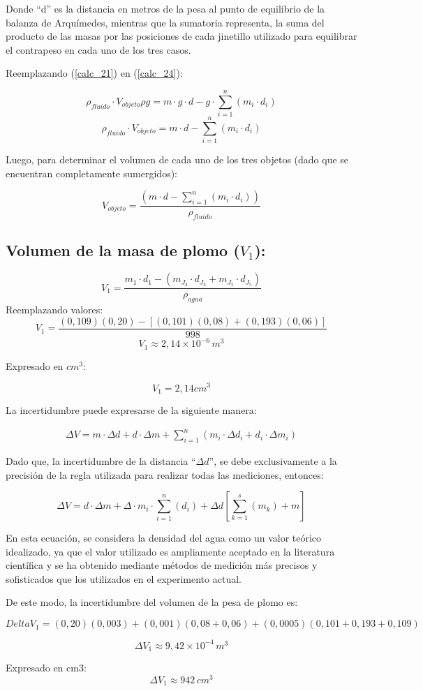\documentclass[../main.tex]{subfiles}
\begin{document}
Donde “d” es la distancia en metros de la pesa al punto de
equilibrio de la balanza de Arquímedes, mientras que la 
sumatoria representa, la suma del producto de las masas por 
las posiciones de cada jinetillo utilizado para equilibrar el 
contrapeso en cada uno de los tres casos.

Reemplazando (\ref{calc_21}) en (\ref{calc_24}):

\[\rho_{fluido}\cdot V_{objeto}\rho g=m\cdot g\cdot d-g\cdot\sum_{i=1}^n (m_i\cdot d_i ) \]
\[\rho_{fluido}\cdot V_{objeto}=m\cdot d-\sum_{i=1}^n (m_i\cdot d_i ) \]

Luego, para determinar el volumen de cada uno de los tres objetos (dado que se encuentran completamente sumergidos):

\begin{equation} \label{calc_25}
    V_{objeto}=\frac{(m\cdot d -\sum_{i=1}^n (m_i\cdot d_i ) )}{\rho_{fluido}} 
\end{equation}

\subsection{Volumen de la masa de plomo ($V_1$):}

\[V_1=\frac{m_1\cdot d_1- (m_{J_3} \cdot d_{J_3}+m_{J_5} \cdot d_{J_5} )}{\rho_{agua}} \]
Reemplazando valores:
\[V_1=\frac{(0,109)(0,20)-[(0,101)(0,08)+(0,193)(0,06)]}{998}\]
\[V_1\approx2,14\times10^{-6}\,  m^3 \]

Expresado en $cm^3$:

\[V_1=2,14cm^3\]

La incertidumbre puede expresarse de la siguiente manera:

\begin{align} \nonumber
    \Delta V=m\cdot\Delta d+d\cdot\Delta m+\sum_{i=1}^n (m_i \cdot\Delta d_i+d_i \cdot\Delta m_i ) 
\end{align}

Dado que, la incertidumbre de la distancia “$\Delta d$”, se debe exclusivamente a la precisión de la
regla utilizada para realizar todas las mediciones, entonces:

\begin{equation} \label{calc_26}
    \Delta V=d\cdot\Delta m+\Delta\cdot m_i \cdot \sum_{i=1}^n (d_i ) +\Delta d\left[\sum_{k=1}^s(m_k ) +m\right]
\end{equation}

En esta ecuación, se considera la densidad del agua como un valor teórico idealizado, ya que el valor utilizado es ampliamente aceptado en la literatura científica y se ha obtenido mediante métodos de medición más precisos y sofisticados que los utilizados en el experimento actual.

De este modo, la incertidumbre del volumen de la pesa de plomo es:

\[Delta V_1=(0,20)(0,003)+(0,001)(0,08+0,06)+(0,0005)(0,101+0,193+0,109)\]

\[\Delta V_1\approx9,42\times 10^{-4} \, m^3\]

Expresado en cm3:
\[\Delta V_1\approx942 \, cm^3\]
\end{document}
